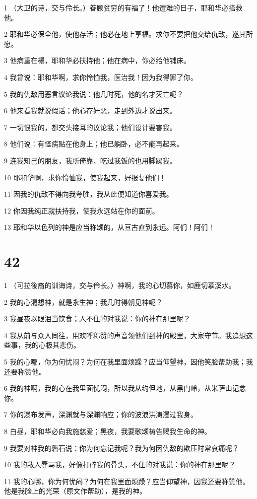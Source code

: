 \par 1 （大卫的诗，交与伶长。）眷顾贫穷的有福了！他遭难的日子，耶和华必搭救他。
\par 2 耶和华必保全他，使他存活；他必在地上享福。求你不要把他交给仇敌，遂其所愿。
\par 3 他病重在榻，耶和华必扶持他；他在病中，你必给他铺床。
\par 4 我曾说：耶和华啊，求你怜恤我，医治我！因为我得罪了你。
\par 5 我的仇敌用恶言议论我说：他几时死，他的名才灭亡呢？
\par 6 他来看我就说假话；他心存奸恶，走到外边才说出来。
\par 7 一切恨我的，都交头接耳的议论我；他们设计要害我。
\par 8 他们说：有怪病贴在他身上；他已躺卧，必不能再起来。
\par 9 连我知己的朋友，我所倚靠、吃过我饭的也用脚踢我。
\par 10 耶和华啊，求你怜恤我，使我起来，好报复他们！
\par 11 因我的仇敌不得向我夸胜，我从此便知道你喜爱我。
\par 12 你因我纯正就扶持我，使我永远站在你的面前。
\par 13 耶和华以色列的神是应当称颂的，从亘古直到永远。阿们！阿们！

\chapter{42}

\par 1 （可拉後裔的训诲诗，交与伶长。）神啊，我的心切慕你，如鹿切慕溪水。
\par 2 我的心渴想神，就是永生神；我几时得朝见神呢？
\par 3 我昼夜以眼泪当饮食；人不住的对我说：你的神在那里呢？
\par 4 我从前与众人同往，用欢呼称赞的声音领他们到神的殿里，大家守节。我追想这些事，我的心极其悲伤。
\par 5 我的心哪，你为何忧闷？为何在我里面烦躁？应当仰望神，因他笑脸帮助我；我还要称赞他。
\par 6 我的神啊，我的心在我里面忧闷，所以我从约但地，从黑门岭，从米萨山记念你。
\par 7 你的瀑布发声，深渊就与深渊响应；你的波浪洪涛漫过我身。
\par 8 白昼，耶和华必向我施慈爱；黑夜，我要歌颂祷告赐我生命的神。
\par 9 我要对神我的磐石说：你为何忘记我呢？我为何因仇敌的欺压时常哀痛呢？
\par 10 我的敌人辱骂我，好像打碎我的骨头，不住的对我说：你的神在那里呢？
\par 11 我的心哪，你为何忧闷？为何在我里面烦躁？应当仰望神，因我还要称赞他。他是我脸上的光荣（原文作帮助），是我的神。

